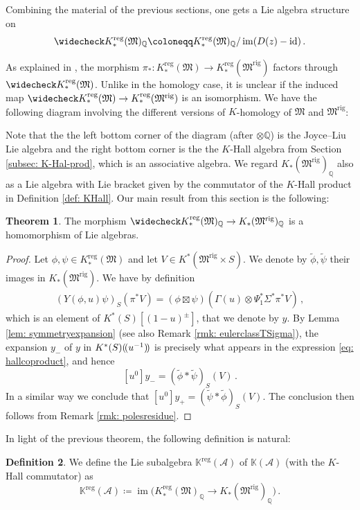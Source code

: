 \documentclass[12pt]{amsart}
\theoremstyle{definition}
\newtheorem{definition}{Definition}[section]
\newtheorem{theorem}[definition]{Theorem}
\newcommand{\BK}{{\mathbb{K}}}
\newcommand{\BQ}{{\mathbb{Q}}}
\newcommand{\CA}{{\mathcal A}}
\newcommand{\1}{\mathbf 1}
\newcommand{\FM}{{\mathfrak{M}}}
\DeclareMathOperator{\id}{id}
\DeclareMathOperator{\im}{im}
\newcommand{\lpp}{(\hspace{-0.15em}(}
\newcommand{\rpp}{)\hspace{-0.15em})}
\newcommand{\rig}{\mathrm{rig}}
\newcommand{\reg}{\mathrm{reg}}
\begin{document}
Combining the material of the previous sections, one gets a Lie algebra structure on 
\[\widecheck K_\ast^\reg(\FM)_\BQ\coloneqq K_*^\reg(\FM)_\BQ/\operatorname{im}(D(z)-\id)\,.\]

As explained in \cite[Lemma 3.3.17]{Liu}, the morphism $\pi_*: K_*^\reg(\FM)\to K_*^\reg(\FM^\rig)$ factors through $\widecheck K_\ast^\reg(\FM)$. Unlike in the homology case, it is unclear if the induced map $\widecheck K_\ast^\reg(\FM)\to K_*^\reg(\FM^\rig)$ is an isomorphism. 
We have the following diagram involving the different versions of $K$-homology of $\FM$ and $\FM^\rig$:

\begin{center}
\end{center}
Note that the the left bottom corner of the diagram (after $\otimes \BQ$) is the Joyce--Liu Lie algebra and the right bottom corner is the the $K$-Hall algebra from Section \ref{subsec: K-Hal-prod}, which is an associative algebra. We regard $K_\ast(\FM^\rig)_\BQ$ also as a Lie algebra with Lie bracket given by the commutator of the $K$-Hall product in Definition \ref{def: KHall}. Our main result from this section is the following:

\begin{theorem}\label{thm: liealgebrahom}
    The morphism $\widecheck K_\ast^\reg(\FM)_\BQ\to K_\ast(\FM^\rig)_\BQ$ is a homomorphism of Lie algebras.
\end{theorem}
\begin{proof}
    Let $\phi, \psi\in K_\ast^\reg(\FM)$ and let $V\in K^\ast(\FM^\rig\times S)$. We denote by $\tilde \phi, \tilde \psi$ their images in $K_\ast(\FM^\rig)$. We have by definition
    \begin{align}\label{eq: proofhomomorphism1}
        (Y(\phi, u)\psi)_S(\pi^\ast V)=(\phi\boxtimes \psi)\left(\Gamma(u)\otimes\Psi_1^\ast\Sigma^\ast\pi^\ast V\right)\,,
    \end{align}
    which is an element of $K^\ast(S)[(1-u)^\pm]$, that we denote by $y$. By Lemma \ref{lem: symmetryexpansion} (see also Remark \ref{rmk: eulerclassTSigma}), the expansion $y_-$ of $y$ in $K^\ast(S)\lpp u^{-1}\rpp$ is precisely what appears in the expression \eqref{eq: hallcoproduct}, and hence
    \[[u^0]y_-=(\tilde \phi\ast \tilde \psi)_S(V)\,.\]
    In a similar way we conclude that $[u^0]y_+=(\tilde \psi\ast \tilde \phi)_S(V)$. The conclusion then follows from Remark \ref{rmk: polesresidue}.
\end{proof}
In light of the previous theorem, the following definition is natural:
\begin{definition}
    We define the Lie subalgebra $\BK^\reg(\CA)$ of $\BK(\CA)$ (with the $K$-Hall commutator) as
    \[\BK^\reg(\CA)\coloneqq \im\big(K_\ast^\reg(\FM)_\BQ\to K_\ast(\FM^\rig)_\BQ\big)\,.\]
\end{definition}
\end{document}
